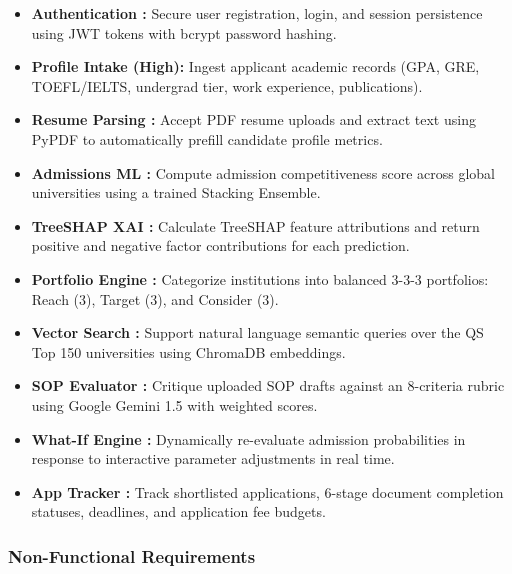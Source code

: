 \begin{itemize}
    \item \textbf{ Authentication :} Secure user registration, login, and session persistence using JWT tokens with bcrypt password hashing.
    \item \textbf{ Profile Intake (High):} Ingest applicant academic records (GPA, GRE, TOEFL/IELTS, undergrad tier, work experience, publications).
    \item \textbf{Resume Parsing :} Accept PDF resume uploads and extract text using PyPDF to automatically prefill candidate profile metrics.
    \item \textbf{ Admissions ML :} Compute admission competitiveness score across global universities using a trained Stacking Ensemble.
    \item \textbf{ TreeSHAP XAI :} Calculate TreeSHAP feature attributions and return positive and negative factor contributions for each prediction.
    \item \textbf{ Portfolio Engine :} Categorize institutions into balanced 3-3-3 portfolios: Reach (3), Target (3), and Consider (3).
    \item \textbf{Vector Search :} Support natural language semantic queries over the QS Top 150 universities using ChromaDB embeddings.
    \item \textbf{SOP Evaluator :} Critique uploaded SOP drafts against an 8-criteria rubric \cite{mit_sop,cmu_admissions,cmu_sop_guidelines,mit_faculty_essay} using Google Gemini 1.5 with weighted scores.
    \item \textbf{ What-If Engine :} Dynamically re-evaluate admission probabilities in response to interactive parameter adjustments in real time.
    \item \textbf{ App Tracker :} Track shortlisted applications, 6-stage document completion statuses, deadlines, and application fee budgets.
\end{itemize}

\subsubsection{Non-Functional Requirements}

